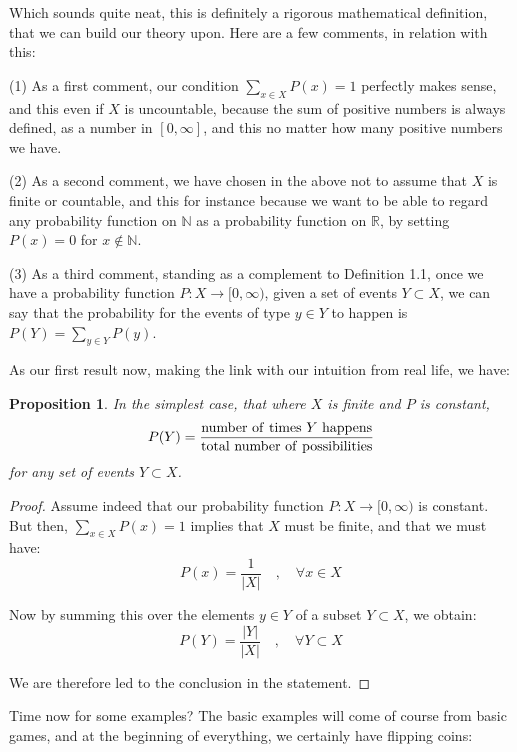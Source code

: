 \documentclass[12pt]{amsbook}
\newtheorem{proposition}[theorem]{Proposition}
\begin{document}
Which sounds quite neat, this is definitely a rigorous mathematical definition, that we can build our theory upon. Here are a few comments, in relation with this:

\bigskip

(1) As a first comment, our condition $\sum_{x\in X}P(x)=1$ perfectly makes sense, and this even if $X$ is uncountable, because the sum of positive numbers is always defined, as a number in $[0,\infty]$, and this no matter how many positive numbers we have.

\bigskip

(2) As a second comment, we have chosen in the above not to assume that $X$ is finite or countable, and this for instance because we want to be able to regard any probability function on $\mathbb N$ as a probability function on $\mathbb R$, by setting $P(x)=0$ for $x\notin\mathbb N$. 

\bigskip

(3) As a third comment, standing as a complement to Definition 1.1, once we have a probability function $P:X\to[0,\infty)$, given a  set of events $Y\subset X$, we can say that the probability for the events of type $y\in Y$ to happen is $P(Y)=\sum_{y\in Y}P(y)$.

\bigskip

As our first result now, making the link with our intuition from real life, we have:

\begin{proposition}
In the simplest case, that where $X$ is finite and $P$ is constant,
$$P(Y)=\frac{{\rm number\ of\ times}\ Y\ {\rm happens}}{{\rm total\ number\ of\ possibilities}}$$
for any set of events $Y\subset X$.
\end{proposition}

\begin{proof}
Assume indeed that our probability function $P:X\to[0,\infty)$ is constant. But then, $\sum_{x\in X}P(x)=1$ implies that $X$ must be finite, and that we must have:
$$P(x)=\frac{1}{|X|}\quad,\quad\forall x\in X$$

Now by summing this over the elements $y\in Y$ of a subset $Y\subset X$, we obtain:
$$P(Y)=\frac{|Y|}{|X|}\quad,\quad\forall Y\subset X$$

We are therefore led to the conclusion in the statement.
\end{proof}

Time now for some examples? The basic examples will come of course from basic games, and at the beginning of everything, we certainly have flipping coins:
\end{document}
